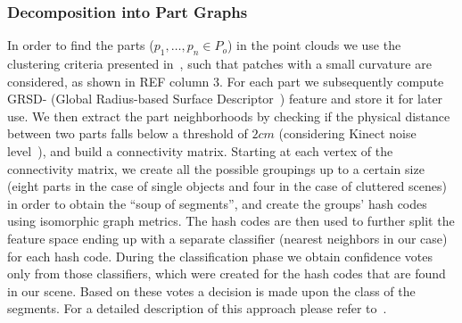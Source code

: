 \subsubsection{Decomposition into Part Graphs}
\label{sec:part-graphs}
In order to find the parts ($p_{1}, \dots, p_{n} \in P_{o}$) 
in the point clouds we use the clustering criteria presented in~\cite{mozos11furniture},
such that patches with a small curvature are considered, as shown in
REF
column 3.  For each part we subsequently compute GRSD- (Global Radius-based 
Surface Descriptor~\cite{irosws11vosch}) feature and store it for later use. We then 
extract the part neighborhoods by checking if the physical distance between two 
parts falls below a threshold of $2cm$ (considering Kinect noise level~\cite{kinect_accuracy}), and build a connectivity matrix. 
Starting at each vertex of the connectivity matrix, we create all the possible groupings up to a certain size 
(eight parts in the case of single objects and four in the case of cluttered scenes) 
in order to obtain the ``soup of segments'', and create the groups' hash codes
using isomorphic graph metrics. The hash codes are then used to further split the feature 
space ending up with a separate classifier (nearest neighbors in our case) for each hash code. 
During the classification phase we obtain confidence votes only from those classifiers,
which were created for the hash codes that are found in our scene. Based on these votes
a decision is made upon the class of the segments. For a detailed description of this approach 
please refer to~\cite{marton12SC}.



